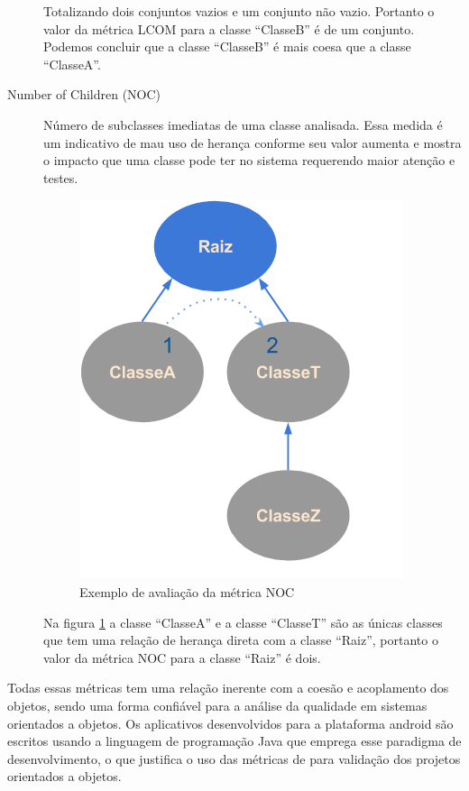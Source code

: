 \begin{description}
Totalizando dois conjuntos vazios e um conjunto não vazio. Portanto o valor da
métrica LCOM para a classe ``ClasseB'' é de um conjunto. Podemos concluir que a
classe ``ClasseB'' é mais coesa que  a classe ``ClasseA''.

\item[Number of Children (NOC)] Número de subclasses imediatas de uma
classe analisada. Essa medida é um indicativo de mau uso de herança conforme seu
valor aumenta e mostra o impacto que uma classe pode ter no sistema requerendo maior
atenção e testes.

\begin{figure}[htb]
	\caption{\label{fig:pic_noc}Exemplo de avaliação da métrica NOC}
	\begin{center}
		\includegraphics[scale=0.6]{img/pic_noc.png}
	\end{center}
\end{figure}

Na figura \ref{fig:pic_noc} a classe ``ClasseA'' e a classe ``ClasseT'' são as
únicas classes que tem uma relação de herança direta com a classe ``Raiz'',
portanto o valor da métrica NOC para a classe ``Raiz'' é  dois.

\end{description}

Todas essas métricas tem uma relação inerente com a coesão e acoplamento dos
objetos, sendo uma forma confiável para a análise da qualidade em sistemas
orientados a objetos. Os aplicativos desenvolvidos para a plataforma android são
escritos usando a linguagem de programação Java que emprega esse paradigma de
desenvolvimento, o que justifica o uso das métricas de  para
validação dos projetos orientados a objetos.

